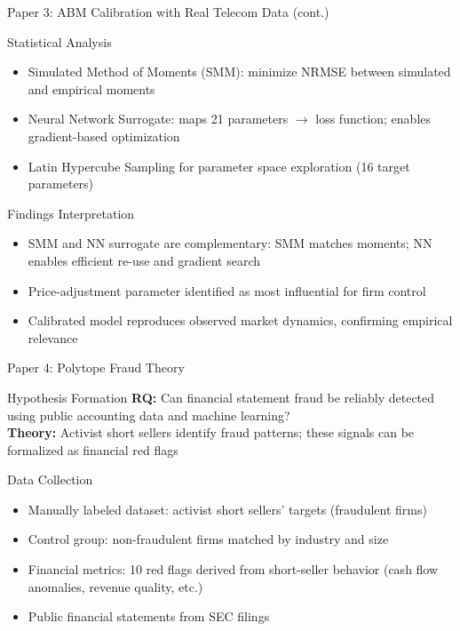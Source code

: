 \documentclass[10pt,aspectratio=169]{beamer}
\begin{document}
\begin{frame}{Paper 3: ABM Calibration with Real Telecom Data (cont.)}
  \begin{block}{Statistical Analysis}
    \begin{itemize}
      \item Simulated Method of Moments (SMM): minimize NRMSE between simulated and empirical moments
      \item Neural Network Surrogate: maps 21 parameters $\rightarrow$ loss function; enables gradient-based optimization
      \item Latin Hypercube Sampling for parameter space exploration (16 target parameters)
    \end{itemize}
  \end{block}

  \begin{alertblock}{Findings Interpretation}
    \begin{itemize}
      \item SMM and NN surrogate are complementary: SMM matches moments; NN enables efficient re-use and gradient search
      \item Price-adjustment parameter identified as most influential for firm control
      \item Calibrated model reproduces observed market dynamics, confirming empirical relevance
    \end{itemize}
  \end{alertblock}
\end{frame}

\begin{frame}{Paper 4: Polytope Fraud Theory}
  \begin{block}{Hypothesis Formation}
    \textbf{RQ:} Can financial statement fraud be reliably detected using public accounting data and machine learning?
    \\
    \textbf{Theory:} Activist short sellers identify fraud patterns; these signals can be formalized as financial red flags
  \end{block}

  \begin{block}{Data Collection}
    \begin{itemize}
      \item Manually labeled dataset: activist short sellers' targets (fraudulent firms)
      \item Control group: non-fraudulent firms matched by industry and size
      \item Financial metrics: 10 red flags derived from short-seller behavior (cash flow anomalies, revenue quality, etc.)
      \item Public financial statements from SEC filings
    \end{itemize}
  \end{block}
\end{frame}
\end{document}
